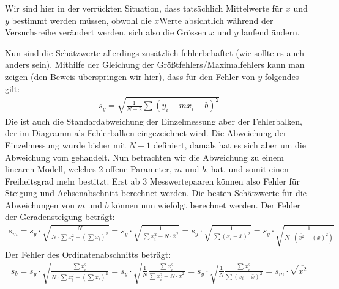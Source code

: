 \documentclass[letterpaper,10pt,english]{jupyterBook}
\begin{document}
\sphinxAtStartPar
Wir sind hier in der verrückten Situation, dass tatsächlich  Mittelwerte für \(x\) und \(y\) bestimmt werden müssen, obwohl die \(x\)\sphinxhyphen{}Werte absichtlich während der Versuchsreihe verändert werden, sich also die Grössen \(x\) und \(y\) laufend ändern.

\sphinxAtStartPar
{}

\sphinxAtStartPar
Nun sind die Schätzwerte allerdings zusätzlich fehlerbehaftet (wie sollte es auch anders sein). Mithilfe der Gleichung der Größtfehlers/Maximalfehlers kann man zeigen (den Beweis überspringen wir hier), dass für den Fehler von \(y\) folgendes gilt:
\begin{equation*}
\begin{split}s_y = \sqrt{\frac{1}{N-2}\sum(y_i - mx_i - b)^2 }\end{split}
\end{equation*}
\sphinxAtStartPar
Die ist auch die Standardabweichung der Einzelmessung aber  der Fehlerbalken, der im Diagramm als Fehlerbalken eingezeichnet wird. Die Abweichung der Einzelmessung wurde bisher mit \(N-1\) definiert, damals hat es sich aber um die Abweichung vom  gehandelt. Nun betrachten wir die Abweichung zu einem linearen Modell, welches 2 offene Parameter, \(m\) und \(b\), hat, und somit einen Freiheitsgrad mehr bestitzt. Erst ab 3 Messwertepaaren können also Fehler für Steigung und Achsenabschnitt berechnet werden.
Die besten Schätzwerte für die Abweichungen von \(m\) und \(b\) können nun wiefolgt berechnet werden. Der Fehler der Geradensteigung beträgt:
\begin{equation*}
\begin{split}s_m = s_y \cdot \sqrt{\frac{N}{N\cdot \sum x_i^2 - \left(\sum x_i\right)^2}} = s_y \cdot \sqrt{\frac{1}{\sum x_i^2 - N\cdot \bar x^2}} = s_y \cdot \sqrt{\frac{1}{\sum \left(x_i - \bar x \right)^2}} = s_y \cdot \sqrt{\frac{1}{N\cdot (\overline{x^2} - (\overline x)^2)}}\end{split}
\end{equation*}
\sphinxAtStartPar
Der Fehler des Ordinatenabschnitts beträgt:
\begin{equation*}
\begin{split}s_b = s_y \cdot \sqrt{\frac{\sum x_i^2}{N\cdot \sum x_i^2 - \left(\sum x_i\right)^2}} = s_y \cdot \sqrt{\frac{1}{N}\frac{\sum x_i^2}{\sum x_i^2 - N\cdot \bar x^2}} = s_y \cdot \sqrt{\frac{1}{N}\frac{\sum x_i^2}{\sum \left(x_i - \bar x \right)^2}} = s_m \cdot \sqrt{\overline{x^2}}\end{split}
\end{equation*}
\end{document}

